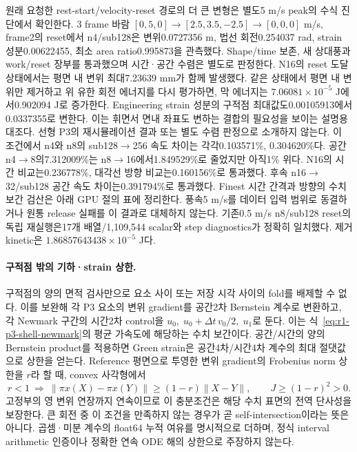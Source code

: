 \documentclass[10pt]{article}
\begin{document}
원래 요청한 rest-start/velocity-reset 경로의 더 큰 변형은 별도5 m/s peak의 수식 진단에서 확인한다.
3 frame 바람 \([0,5,0]\to[2.5,3.5,-2.5]\to[0,0,0]\) m/s,
frame2의 reset에서 n4/sub128은 변위0.0727356 m, 법선 회전0.254037 rad,
strain 성분0.00622455, 최소 area ratio0.995873을 관측했다.
Shape/time 보존, 새 상대풍과 work/reset 장부를 통과했으며 시간·공간 수렴은 별도로 판정한다.
N16의 reset 도달 상태에서는 평면 내 변위 최대7.23639 mm가 함께 발생했다.
같은 상태에서 평면 내 변위만 제거하고 위 유한 회전 에너지를 다시 평가하면,
막 에너지는 \(7.06081\times10^{-5}\) J에서0.902094 J로 증가한다.
Engineering strain 성분의 구적점 최대값도0.00105913에서0.0337355로 변한다.
이는 휘면서 면내 좌표도 변하는 결합의 필요성을 보이는 설명용 대조다.
선형 P3의 재시뮬레이션 결과 또는 별도 수렴 판정으로 소개하지 않는다.
이 조건에서 n4와 n8의 sub128$\to$256 속도 차이는 각각0.103571\%, 0.304620\%다.
공간 n4$\to$8의7.312009\%는 n8$\to$16에서1.849529\%로 줄었지만 아직1\% 위다.
N16의 시간 비교는0.236778\%, 대각선 방향 비교는0.160156\%로 통과했다.
후속 n16$\to$32/sub128 공간 속도 차이는0.391794\%로 통과했다.
Finest 시간 간격과 방향의 수치 보간 검산은 아래 GPU 절의 표에 정리한다.
풍속5 m/s를 데이터 입력 범위로 동결하거나 원통 release 실패를 이 결과로 대체하지 않는다.
기존0.5 m/s n8/sub128 reset의 독립 재실행은17개 배열/1,109,544 scalar와
step diagnostics가 정확히 일치했다. 제거 kinetic은 \(1.86857643438\times10^{-5}\) J다.

\paragraph{구적점 밖의 기하·strain 상한.}
구적점의 양의 면적 검사만으로 요소 사이 또는 저장 시각 사이의 fold를 배제할 수 없다.
이를 보완해 각 P3 요소의 변위 gradient를 공간2차 Bernstein 계수로 변환하고,
각 Newmark 구간의 시간2차 control을
\(u_0,\;u_0+\Delta t\,v_0/2,\;u_1\)로 둔다.
이는 식~\eqref{eq:r1-p3-shell-newmark}의 평균 가속도에 해당하는 수치 보간이다.
공간/시간의 양의 Bernstein product를 적용하면 Green strain은 공간4차/시간4차 계수의
최대 절댓값으로 상한을 얻는다. Reference 평면으로 투영한 변위 gradient의
Frobenius norm 상한을 \(r\)라 할 때, convex 사각형에서
\[
 r<1\ \Longrightarrow\
 \|\pi x(X)-\pi x(Y)\|\ge(1-r)\|X-Y\|,\qquad
 J\ge(1-r)^2>0 .
\]
고정부의 영 변위 연장까지 연속이므로 이 충분조건은 해당 수치 표면의 전역 단사성을 보장한다.
큰 회전 중 이 조건을 만족하지 않는 경우가 곧 self-intersection이라는 뜻은 아니다.
곱셈·미분 계수의 float64 누적 여유를 명시적으로 더하며, 정식 interval arithmetic 인증이나
정확한 연속 ODE 해의 상한으로 주장하지 않는다.
\end{document}
